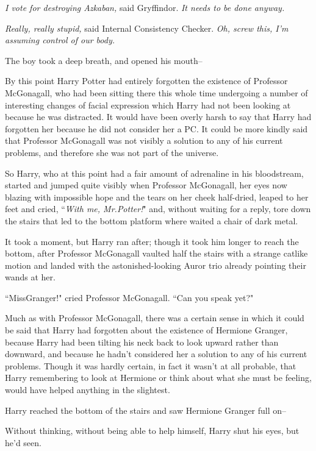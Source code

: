 \emph{I vote for destroying Azkaban,} said Gryffindor. \emph{It needs to be done anyway.}

\emph{Really, really stupid,} said Internal Consistency Checker. \emph{Oh, screw this, I'm assuming control of our body.}

The boy took a deep breath, and opened his mouth\---

By this point Harry Potter had entirely forgotten the existence of Professor McGonagall, who had been sitting there this whole time undergoing a number of interesting changes of facial expression which Harry had not been looking at because he was distracted. It would have been overly harsh to say that Harry had forgotten her because he did not consider her a PC. It could be more kindly said that Professor McGonagall was not visibly a solution to any of his current problems, and therefore she was not part of the universe.

So Harry, who at this point had a fair amount of adrenaline in his bloodstream, started and jumped quite visibly when Professor McGonagall, her eyes now blazing with impossible hope and the tears on her cheek half-dried, leaped to her feet and cried, ``\emph{With me, Mr.\?Potter!}" and, without waiting for a reply, tore down the stairs that led to the bottom platform where waited a chair of dark metal.

It took a moment, but Harry ran after; though it took him longer to reach the bottom, after Professor McGonagall vaulted half the stairs with a strange catlike motion and landed with the astonished-looking Auror trio already pointing their wands at her.

``Miss\?Granger!" cried Professor McGonagall. ``Can you speak yet?"

Much as with Professor McGonagall, there was a certain sense in which it could be said that Harry had forgotten about the existence of Hermione Granger, because Harry had been tilting his neck back to look upward rather than downward, and because he hadn't considered her a solution to any of his current problems. Though it was hardly certain, in fact it wasn't at all probable, that Harry remembering to look at Hermione or think about what she must be feeling, would have helped anything in the slightest.

Harry reached the bottom of the stairs and saw Hermione Granger full on\---

Without thinking, without being able to help himself, Harry shut his eyes, but he'd seen.

